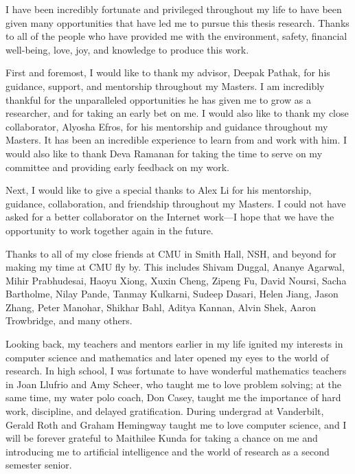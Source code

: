 \begin{acknowledgments}
    I have been incredibly fortunate and privileged throughout my life to have been given many opportunities that have led me to pursue this thesis research. Thanks to all of the people who have provided me with the environment, safety, financial well-being, love, joy, and knowledge to produce this work.

    First and foremost, I would like to thank my advisor, Deepak Pathak, for his guidance, support, and mentorship throughout my Masters.
    I am incredibly thankful for the unparalleled opportunities he has given me to grow as a researcher, and for taking an early bet on me.
    I would also like to thank my close collaborator, Alyosha Efros, for his mentorship and guidance throughout my Masters. It has been an incredible experience to learn from and work with him.
    I would also like to thank Deva Ramanan for taking the time to serve on my committee and providing early feedback on my work.

    Next, I would like to give a special thanks to Alex Li for his mentorship, guidance, collaboration, and friendship throughout my Masters. I could not have asked for a better collaborator on the Internet work---I hope that we have the opportunity to work together again in the future.

    Thanks to all of my close friends at CMU in Smith Hall, NSH, and beyond for making my time at CMU fly by. This includes
    Shivam Duggal,
    Ananye Agarwal,
    Mihir Prabhudesai,
    Haoyu Xiong,
    Xuxin Cheng,
    Zipeng Fu,
    David Noursi,
    Sacha Bartholme,
    Nilay Pande,
    Tanmay Kulkarni,
    Sudeep Dasari,
    Helen Jiang,
    Jason Zhang,
    Peter Manohar,
    Shikhar Bahl,
    Aditya Kannan,
    Alvin Shek,
    Aaron Trowbridge,
    and many others.

    Looking back, my teachers and mentors earlier in my life ignited my interests in computer science and mathematics and later opened my eyes to the world of research.
    In high school,
    I was fortunate to have wonderful mathematics teachers in
    Joan Llufrio and Amy Scheer, who taught me to love problem solving;
    at the same time, my water polo coach, Don Casey, taught me the importance of hard work, discipline, and delayed gratification.
    During undergrad at Vanderbilt,
    Gerald Roth and Graham Hemingway taught me to love computer science, and I will be forever grateful to Maithilee Kunda for taking a chance on me and introducing me to artificial intelligence and the world of research as a second semester senior.
    

\end{acknowledgments}

